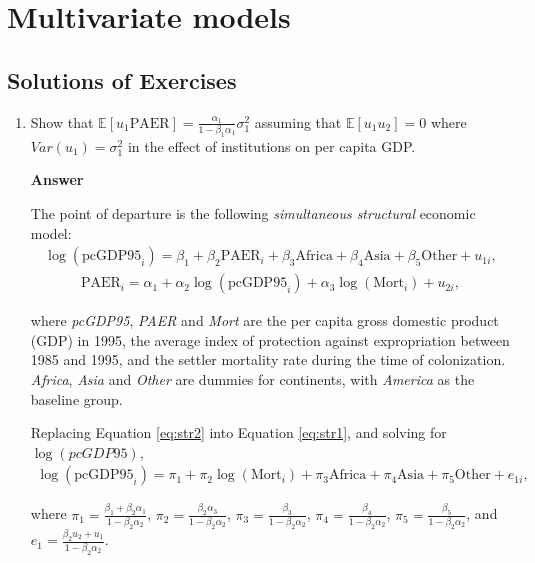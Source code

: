 \chapter{Multivariate models}\label{chap7}

\section*{Solutions of Exercises}\label{sec71}
\begin{enumerate}[leftmargin=*]

	\item Show that $\mathbb{E}[u_1\text{PAER}]=\frac{\alpha_1}{1-\beta_1\alpha_1}\sigma^2_1$ assuming that $\mathbb{E}[u_1u_2]=0$ where $Var(u_1)=\sigma^2_1$ in the effect of institutions on per capita GDP.
	
	\textbf{Answer}
	
	The point of departure is the following \textit{simultaneous structural} economic model:
	\begin{align}\label{eq:str1}
		\log(\text{pcGDP95}_i)=\beta_1+\beta_2\text{PAER}_i+\beta_3 \text{Africa}+\beta_4 \text{Asia}+\beta_5 \text{Other}+u_{1i},
	\end{align}
	\begin{align}\label{eq:str2}
		\text{PAER}_i=\alpha_1+\alpha_2\log(\text{pcGDP95}_i)+\alpha_3\log(\text{Mort}_i)+u_{2i},
	\end{align}

where \textit{pcGDP95}, \textit{PAER} and \textit{Mort} are the per capita gross domestic product (GDP) in 1995, the average index of protection against expropriation between 1985 and 1995, and the settler mortality rate during the time of colonization. \textit{Africa}, \textit{Asia} and \textit{Other} are dummies for continents, with \textit{America} as the baseline group.

Replacing Equation \ref{eq:str2} into Equation \ref{eq:str1}, and solving for $\log(\textit{pcGDP95})$,
\begin{align}\label{eq:red1}
	\log(\text{pcGDP95}_i)=\pi_1+\pi_2\log(\text{Mort}_i)+\pi_3 \text{Africa}+\pi_4 \text{Asia}+\pi_5 \text{Other}+e_{1i},   
\end{align}

where $\pi_1=\frac{\beta_1+\beta_2\alpha_1}{1-\beta_2\alpha_2}$, $\pi_2=\frac{\beta_2\alpha_3}{1-\beta_2\alpha_2}$, $\pi_3=\frac{\beta_3}{1-\beta_2\alpha_2}$, $\pi_4=\frac{\beta_4}{1-\beta_2\alpha_2}$, 
$\pi_5=\frac{\beta_5}{1-\beta_2\alpha_2}$, and $e_1=\frac{\beta_2u_2+u_1}{1-\beta_2\alpha_2}$.


\end{enumerate}
